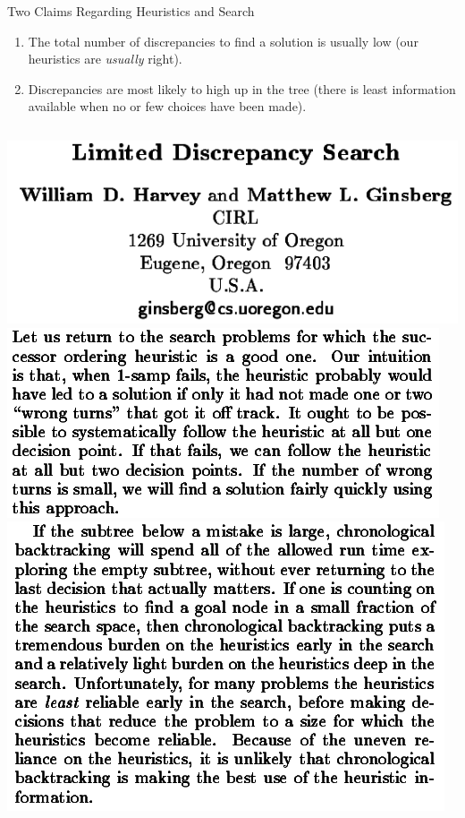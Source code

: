 \documentclass{beamer}
\begin{document}
\begin{frame}{Two Claims Regarding Heuristics and Search}

    \begin{enumerate}
        \item The total number of discrepancies to find a solution is usually low (our heuristics
            are \emph{usually} right).
        \item Discrepancies are most likely to high up in the tree (there is least
            information available when no or few choices have been made).
    \end{enumerate}

    \vspace{1em}

    \begin{columns}[T]
        \centering\includegraphics*[keepaspectratio=true,scale=0.18]{lds-paper.png}
        \centering\includegraphics*[keepaspectratio=true,scale=0.18]{lds-claim1.png}
        \centering\includegraphics*[keepaspectratio=true,scale=0.18]{lds-claim2.png}
    \end{columns}

\end{frame}
\end{document}
